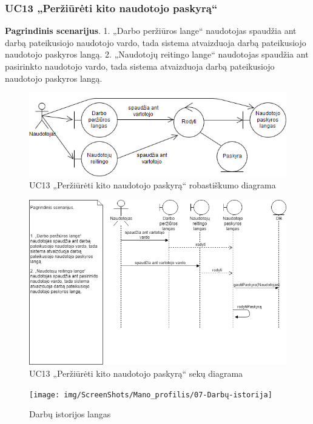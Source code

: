 \documentclass{VUMIFPSbakalaurinis}
\begin{document}
\subsubsection{UC13 „Peržiūrėti kito naudotojo paskyrą“}
\textbf{Pagrindinis scenarijus}. 1. „Darbo peržiūros lange“ naudotojas spaudžia ant darbą pateikusiojo naudotojo vardo, tada sistema atvaizduoja darbą pateikusiojo naudotojo paskyros langą.
2. „Naudotojų reitingo lange“ naudotojas spaudžia ant pasirinkto naudotojo vardo, tada sistema atvaizduoja darbą pateikusiojo naudotojo paskyros langą.

\begin{figure}[H]
	\centering
	\includegraphics[scale=0.6]{img/Robustness/UC13}
	\caption{UC13 „Peržiūrėti kito naudotojo paskyrą“ robastiškumo diagrama}
	\label{img:uc13rob}
\end{figure}

\begin{figure}[H]
	\centering
	\includegraphics[scale=0.6]{img/Sequence/SD13}
	\caption{UC13 „Peržiūrėti kito naudotojo paskyrą“ sekų diagrama}
	\label{img:uc13seq}
\end{figure}

\begin{figure}[H]
	\centering
	\texttt{[image: img/ScreenShots/Mano\_profilis/07-Darbų-istorija]}
	\caption{Darbų istorijos langas}
	\label{img:work history}
\end{figure}
\end{document}
